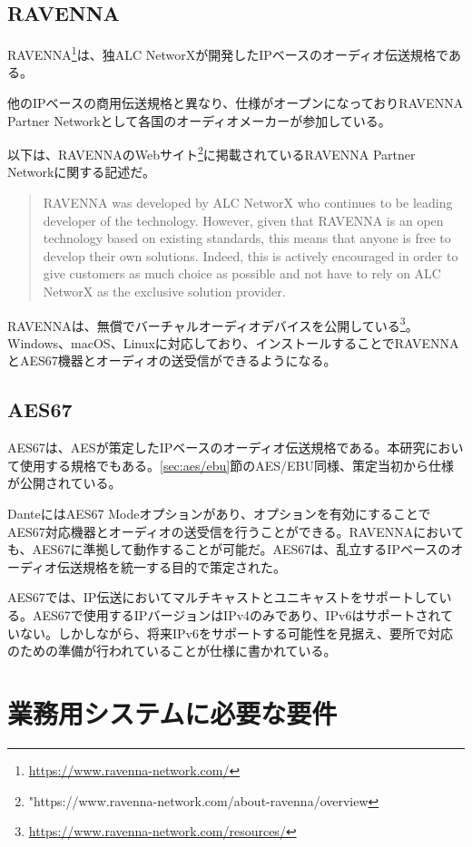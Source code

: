 \subsection{RAVENNA}

RAVENNA\footnote{\url{https://www.ravenna-network.com/}}は、独ALC NetworXが開発したIPベースのオーディオ伝送規格である。

他のIPベースの商用伝送規格と異なり、仕様がオープンになっておりRAVENNA Partner Networkとして各国のオーディオメーカーが参加している。

以下は、RAVENNAのWebサイト\footnote{"https://www.ravenna-network.com/about-ravenna/overview}に掲載されているRAVENNA Partner Networkに関する記述だ。

\begin{quotation}
  RAVENNA was developed by ALC NetworX who continues to be leading developer of the technology. However, given that RAVENNA is an open technology based on existing standards, this means that anyone is free to develop their own solutions. Indeed, this is actively encouraged in order to give customers as much choice as possible and not have to rely on ALC NetworX as the exclusive solution provider.
\end{quotation}

RAVENNAは、無償でバーチャルオーディオデバイスを公開している\footnote{\url{https://www.ravenna-network.com/resources/}}。Windows、macOS、Linuxに対応しており、インストールすることでRAVENNAとAES67機器とオーディオの送受信ができるようになる。

\subsection{AES67}

AES67は、AESが策定したIPベースのオーディオ伝送規格である。本研究において使用する規格でもある。\ref{sec:aes/ebu}節のAES/EBU同様、策定当初から仕様が公開されている。

DanteにはAES67 Modeオプションがあり、オプションを有効にすることでAES67対応機器とオーディオの送受信を行うことができる。RAVENNAにおいても、AES67に準拠して動作することが可能だ。AES67は、乱立するIPベースのオーディオ伝送規格を統一する目的で策定された。

AES67では、IP伝送においてマルチキャストとユニキャストをサポートしている。AES67で使用するIPバージョンはIPv4のみであり、IPv6はサポートされていない。しかしながら、将来IPv6をサポートする可能性を見据え、要所で対応のための準備が行われていることが仕様に書かれている。

\section{業務用システムに必要な要件}
\label{sec:pro_audio_requirement}


